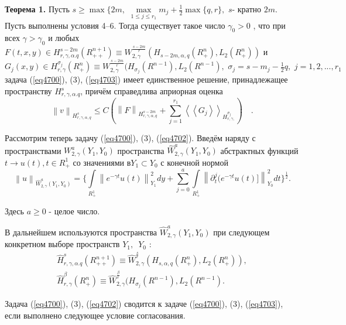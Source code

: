 \textbf{Теорема 1. }
Пусть $s \geqslant \max \{2m,\,\,\mathop {\max }\limits_{1 \leqslant
j \leqslant r_1 } m_j + \frac{1}{2}\max \{q,r\},\,\,s$- кратно $2m$. Пусть
выполнены условия 4--6. Тогда существует такое число $\gamma _0 > 0$ , что
при всех $\gamma > \gamma _0 $ и любых $F(t,x,y) \in H_{r,\gamma ,\alpha
.q}^{s - 2m} (R_{ + + }^{n + 1} ) \equiv W_{2,\gamma }^{\frac{s - 2m}{r}}
(H_{s - 2m,\alpha ,q} (R_ + ^n ),L_2 (R_ + ^n ))$ и
\linebreak
$G_j (x,y) \in
H_{r,\gamma }^{\sigma _j } (R_ + ^n ) \equiv W_{2,\gamma }^{\frac{s -
2m}{r}} (H_{\sigma _j } (R^{n - 1}),L_2 (R^{n - 1}),\,\,\sigma _j = s - m_j
- \frac{1}{2}q,\,\,j = 1,2,...,r_1 $ задача (\ref{eq4700}), (3), (\ref{eq4703}) имеет единственное
решение, принадлежащее пространству $H_{r,\gamma ,\alpha .q}^s $, причём
справедлива априорная оценка
\[
\left\| v \right\|_{H_{r,\gamma ,\alpha ,q}^s } \leqslant C(\left\| F
\right\|_{H_{r,\gamma ,\alpha ,q}^{s - 2m} } + \sum\limits_{j = 1}^{r_1 }
{\left\langle {\left\langle {G_j } \right\rangle } \right\rangle }
_{H_{r,\gamma ,}^{\sigma _j } } ) \quad .
\]






Рассмотрим теперь задачу (\ref{eq4700}), (3), (\ref{eq4702}). Введём наряду с пространствами
$W_{2,\gamma }^a (Y_1 ,Y_0 )$ пространства $\hat {W}_{2,\gamma }^a (Y_1 ,Y_0
)$ абстрактных функций $t \to u(t),t \in R_ + ^1 $ со значениями в$Y_1
\subset Y_0 $ с конечной нормой
\[
\left\| u \right\|_{\hat {W}_{2,\gamma }^a (Y_1 ,Y_0 )} = \{\int\limits_{R_
+ ^1 } {\left\| {e^{ - \gamma t}u(t)} \right\|_{Y_1 }^2 dy} + \sum\limits_{j
= 0}^a {\int\limits_{R_ + ^1 } {\left\| {\partial _t^j (e^{ - \gamma
t}u(t)]} \right\|_{Y_0 }^2 dt\}^{\frac{1}{2}}} } .
\]

Здесь $a \geqslant 0$ - целое число.

В дальнейшем используются пространства $\hat {W}_{2,\gamma }^a (Y_1 ,Y_0 )$
при следующем конкретном выборе пространств $Y_1 ,\,\,\,Y_0 $ :
\begin{gather*}
\hat {H}_{r,\gamma ,\alpha .q}^s (R_{ + + }^{n + 1} ) \equiv \hat
{W}_{2,\gamma }^{\frac{s}{r}} (H_{s,\alpha ,q} (R_ + ^n ),L_2 (R_ + ^n )),
\\
\hat {H}_{r,\gamma }^\beta (R_ + ^n ) \equiv \hat {W}_{2,\gamma
}^{\frac{\beta }{r}} (H_{\sigma _j } (R^{n - 1}),L_2 (R^{n - 1}).
\end{gather*}



Задача (\ref{eq4700}), (3), (\ref{eq4702}) сводится к задаче (\ref{eq4700}), (3), (\ref{eq4703}), если выполнено
следующее условие согласования.

